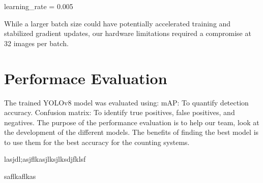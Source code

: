 learning\_rate = 0.005

While a larger batch size could have potentially accelerated training and stabilized gradient updates, our hardware limitations required a compromise at 32 images per batch.

\section{Performace Evaluation}

The trained YOLOv8 model was evaluated using:
mAP: To quantify detection accuracy.
Confusion matrix: To identify true positives, false positives, and negatives.
The purpose of the performance evaluation is to help our team, look at the development of the different models. The benefits of finding the best model is to use them for the best accuracy for the counting systems.

lasjdl;asjflkasjlksjlksdjfklsf

saflkaflkas